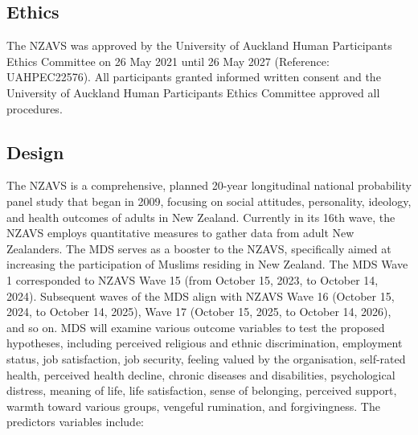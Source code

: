 \documentclass[
]{interact}
\begin{document}
\subsection{Ethics}\label{ethics}

The NZAVS was approved by the University of Auckland Human Participants
Ethics Committee on 26 May 2021 until 26 May 2027 (Reference:
UAHPEC22576). All participants granted informed written consent and the
University of Auckland Human Participants Ethics Committee approved all
procedures.

\subsection{Design}\label{design}

The NZAVS is a comprehensive, planned 20-year longitudinal national
probability panel study that began in 2009, focusing on social
attitudes, personality, ideology, and health outcomes of adults in New
Zealand. Currently in its 16th wave, the NZAVS employs quantitative
measures to gather data from adult New Zealanders. The MDS serves as a
booster to the NZAVS, specifically aimed at increasing the participation
of Muslims residing in New Zealand. The MDS Wave 1 corresponded to NZAVS
Wave 15 (from October 15, 2023, to October 14, 2024). Subsequent waves
of the MDS align with NZAVS Wave 16 (October 15, 2024, to October 14,
2025), Wave 17 (October 15, 2025, to October 14, 2026), and so on. MDS
will examine various outcome variables to test the proposed hypotheses,
including perceived religious and ethnic discrimination, employment
status, job satisfaction, job security, feeling valued by the
organisation, self-rated health, perceived health decline, chronic
diseases and disabilities, psychological distress, meaning of life, life
satisfaction, sense of belonging, perceived support, warmth toward
various groups, vengeful rumination, and forgivingness. The predictors
variables include:
\end{document}
